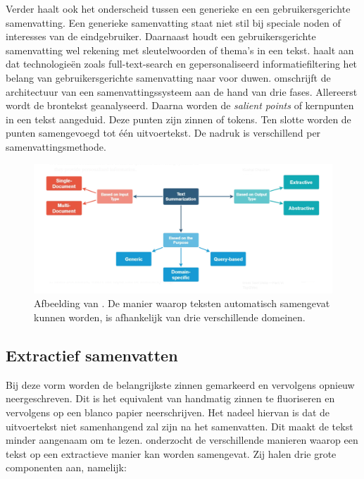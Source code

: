 Verder haalt \textcite{Hahn2000} ook het onderscheid tussen een generieke en een gebruikersgerichte samenvatting. Een generieke samenvatting staat niet stil bij speciale noden of interesses van de eindgebruiker. Daarnaast houdt een gebruikersgerichte samenvatting wel rekening met sleutelwoorden of thema's in een tekst. \textcite{Hahn2000} haalt aan dat technologieën zoals full-text-search en gepersonaliseerd informatiefiltering het belang van gebruikersgerichte samenvatting naar voor duwen. \textcite{Hahn2000} omschrijft de architectuur van een samenvattingssysteem aan de hand van drie fases. Allereerst wordt de brontekst geanalyseerd. Daarna worden de \textit{salient points} of kernpunten in een tekst aangeduid. Deze punten zijn zinnen of tokens. Ten slotte worden de punten samengevoegd tot één uitvoertekst. De nadruk is verschillend per samenvattingsmethode.

\begin{figure}
	\includegraphics{img/summarization-mindmap.png}
	\caption{Afbeelding van \textcite{Chauchan2018}. De manier waarop teksten automatisch samengevat kunnen worden, is afhankelijk van drie verschillende domeinen.}
\end{figure}

\subsection{Extractief samenvatten}


Bij deze vorm worden de belangrijkste zinnen gemarkeerd en vervolgens opnieuw neergeschreven.  Dit is het equivalent van handmatig zinnen te fluoriseren en vervolgens op een blanco papier neerschrijven. Het nadeel hiervan is dat de uitvoertekst niet samenhangend zal zijn na het samenvatten. Dit maakt de tekst minder aangenaam om te lezen. \textcite{Verma2020} onderzocht de verschillende manieren waarop een tekst op een extractieve manier kan worden samengevat. Zij halen drie grote componenten aan, namelijk:

